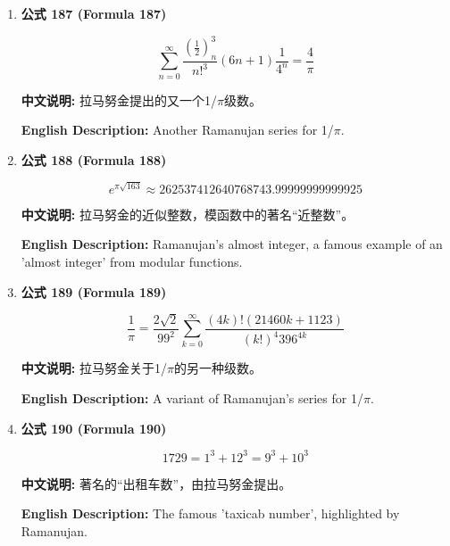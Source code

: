 \documentclass[12pt,a4paper]{article}
\begin{document}
\begin{enumerate}[leftmargin=*]
\vspace{0.5cm}

\item \textbf{公式 187 (Formula 187)}

\begin{equation}
\sum_{n=0}^{\infty} \frac{(\frac{1}{2})_n^3}{n!^3}(6n+1)\frac{1}{4^n} = \frac{4}{\pi}
\end{equation}

\textbf{中文说明:} 拉马努金提出的又一个1/$\pi$级数。

\textbf{English Description:} Another Ramanujan series for 1/$\pi$.

\vspace{0.5cm}

\item \textbf{公式 188 (Formula 188)}

\begin{equation}
e^{\pi \sqrt{163}} \approx 262537412640768743.99999999999925
\end{equation}

\textbf{中文说明:} 拉马努金的近似整数，模函数中的著名“近整数”。

\textbf{English Description:} Ramanujan's almost integer, a famous example of an 'almost integer' from modular functions.

\vspace{0.5cm}

\item \textbf{公式 189 (Formula 189)}

\begin{equation}
\frac{1}{\pi} = \frac{2\sqrt{2}}{99^2} \sum_{k=0}^{\infty} \frac{(4k)! (21460k+1123)}{(k!)^4 396^{4k}}
\end{equation}

\textbf{中文说明:} 拉马努金关于1/$\pi$的另一种级数。

\textbf{English Description:} A variant of Ramanujan's series for 1/$\pi$.

\vspace{0.5cm}

\item \textbf{公式 190 (Formula 190)}

\begin{equation}
1729 = 1^3 + 12^3 = 9^3 + 10^3
\end{equation}

\textbf{中文说明:} 著名的“出租车数”，由拉马努金提出。

\textbf{English Description:} The famous 'taxicab number', highlighted by Ramanujan.


\end{enumerate}
\end{document}
